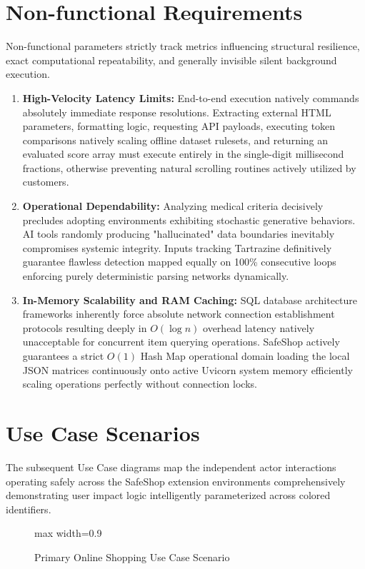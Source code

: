 \documentclass[12pt,a4paper]{report}
\begin{document}
\section{Non-functional Requirements}
Non-functional parameters strictly track metrics influencing structural resilience, exact computational repeatability, and generally invisible silent background execution. 
\begin{enumerate}
    \item \textbf{High-Velocity Latency Limits:} End-to-end execution natively commands absolutely immediate response resolutions. Extracting external HTML parameters, formatting logic, requesting API payloads, executing token comparisons natively scaling offline dataset rulesets, and returning an evaluated score array must execute entirely in the single-digit millisecond fractions, otherwise preventing natural scrolling routines actively utilized by customers.
    \item \textbf{Operational Dependability:} Analyzing medical criteria decisively precludes adopting environments exhibiting stochastic generative behaviors. AI tools randomly producing "hallucinated" data boundaries inevitably compromises systemic integrity. Inputs tracking Tartrazine definitively guarantee flawless detection mapped equally on 100\% consecutive loops enforcing purely deterministic parsing networks dynamically.
    \item \textbf{In-Memory Scalability and RAM Caching:} SQL database architecture frameworks inherently force absolute network connection establishment protocols resulting deeply in $O(\log n)$ overhead latency natively unacceptable for concurrent item querying operations. SafeShop actively guarantees a strict $O(1)$ Hash Map operational domain loading the local JSON matrices continuously onto active Uvicorn system memory efficiently scaling operations perfectly without connection locks.
\end{enumerate}

\section{Use Case Scenarios}

The subsequent Use Case diagrams map the independent actor interactions operating safely across the SafeShop extension environments comprehensively demonstrating user impact logic intelligently parameterized across colored identifiers.

\begin{figure}[htbp]
    \centering
    \begin{adjustbox}{max width=0.9\textwidth}
    \end{adjustbox}
    \caption{Primary Online Shopping Use Case Scenario}
\end{figure}
\end{document}
